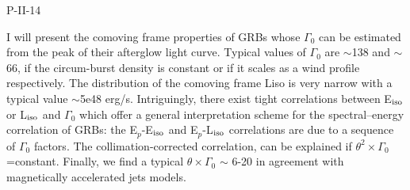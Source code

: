 P-II-14


\bigskip



\bigskip

\noindent I will present the comoving frame properties of GRBs whose $\Gamma_0$ can be estimated from the peak of their afterglow light curve. Typical values of $\Gamma_0$ are $\sim$138 and $\sim$66, if the circum-burst density is constant or if it scales as a wind profile respectively. The distribution of the comoving frame Liso is very narrow  with a typical value $\sim$5e48 erg/s. Intriguingly, there exist tight correlations between E$_{\rm iso}$ or L$_{\rm iso}$ and $\Gamma_0$ which offer a general interpretation scheme for the spectral--energy correlation of GRBs: the E$_p$-E$_{\rm iso}$ and E$_p$-L$_{\rm iso}$ correlations are due to a sequence of $\Gamma_0$ factors. The collimation-corrected correlation, can be explained  if $\theta^2 \times \Gamma_0$=constant. Finally, we find a typical $\theta \times \Gamma_0$ $\sim$ 6-20 in agreement with magnetically accelerated jets models.


